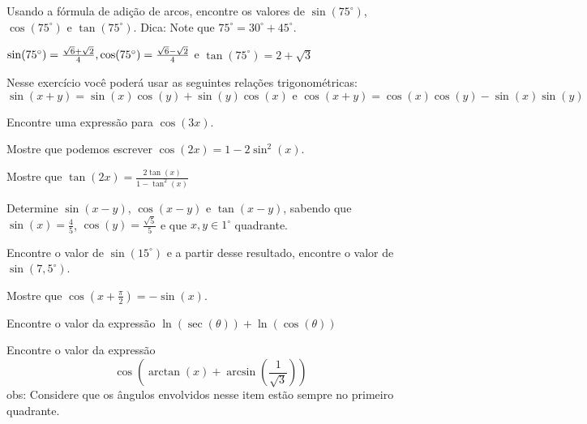 \begin{exercises*}
\begin{exercise}
  Usando a fórmula de adição de arcos, encontre os valores de $\sin(75^{
  \circ})$, $\cos(75^{ \circ})$ e $\tan(75^{ \circ})$. Dica: Note que
  $75^{\circ}=30^{\circ}+ 45^{\circ}$.

  \begin{answer}
    $\sin(75^{\circ})= \frac{\sqrt{6}+ \sqrt{2}}{4}, \space
    \cos(75^{\circ})=\frac{\sqrt{6}-\sqrt{2}}{4}$ e $\tan(75^{\circ})=
    2+\sqrt{3}$
  \end{answer}
\end{exercise}

\begin{exercise}
  Nesse exercício você poderá usar as seguintes relações trigonométricas:
  \[
    \sin(x+y) = \sin(x)\cos(y)+\sin(y)\cos(x) \text{ e }
    \cos(x+y) = \cos(x)\cos(y)-\sin(x)\sin(y)
  \]
  \begin{alphalist}
    \item Encontre uma expressão para $\cos(3x)$.
    \item Mostre que podemos escrever $\cos(2x)=1-2\sin^2(x)$.
    \item Mostre que $\tan(2x)=\frac{2\tan(x)}{1-\tan^2(x)}$
    \item Determine $\sin(x-y)$, $\cos(x-y)$ e $\tan(x-y)$, sabendo que
          $\sin(x)=\frac{4}{5}$, $\cos(y)=\frac{\sqrt{5}}{5}$ e que $x,y \in
          1^{\circ}$ quadrante.
    \item  Encontre o valor de $\sin(15^{\circ})$ e a partir desse resultado,
          encontre o valor de $\sin(7,5^{\circ})$.
    \item Mostre que $\cos \left(x + \frac{\pi}{2}\right)=-\sin(x)$.
    \item Encontre o valor da expressão $\ln(\sec(\theta))+\ln(\cos(\theta))$
    \item Encontre o valor da expressão
          \[\cos(\arctan(x)+\arcsin(\frac{1}{\sqrt{3}}))\]
          obs: Considere que os ângulos envolvidos nesse item estão sempre no
          primeiro quadrante.
  \end{alphalist}


\end{exercise}
\end{exercises*}
